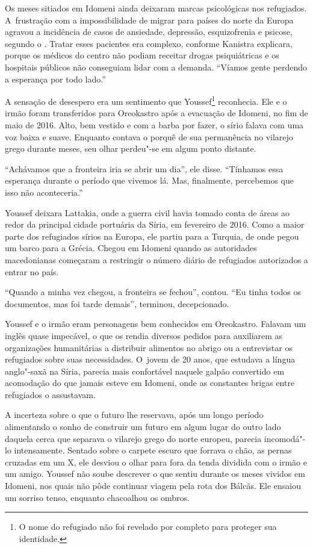 Os meses sitiados em Idomeni ainda deixaram marcas psicológicas nos
refugiados. A~frustração com a impossibilidade de migrar para países do
norte da Europa agravou a incidência de casos de ansiedade, depressão,
esquizofrenia e psicose, segundo o . Tratar esses pacientes era
complexo, conforme Kanistra explicara, porque os médicos do centro não podiam receitar drogas psiquiátricas e os hospitais públicos não conseguiam lidar com a
demanda. ``Víamos gente perdendo a esperança por todo lado.''

A sensação de desespero era um sentimento que Youssef\footnote{ O nome do refugiado não foi revelado por completo
para proteger sua identidade.} 
reconhecia. Ele e o irmão foram transferidos para Oreokastro após a
evacuação de Idomeni, no fim de maio de 2016. Alto, bem vestido e com a
barba por fazer, o sírio falava com uma voz baixa e suave. Enquanto
contava o porquê de sua permanência no vilarejo grego durante meses, seu olhar
perdeu"-se em algum ponto distante.

``Achávamos que a fronteira iria se abrir um dia'', ele disse. ``Tínhamos
essa esperança durante o período que vivemos lá. Mas,
finalmente, percebemos que isso não aconteceria.''

Youssef deixara Lattakia, onde a guerra civil havia tomado conta de
áreas ao redor da principal cidade portuária da Síria, em fevereiro de
2016. Como a maior parte dos refugiados sírios na Europa, ele partiu para a
Turquia, de onde pegou um barco para a Grécia. Chegou em Idomeni quando
as autoridades macedonianas começaram a restringir o número diário de
refugiados autorizados a entrar no país.

``Quando a minha vez chegou, a fronteira se fechou'', contou. ``Eu
tinha todos os documentos, mas foi tarde demais'', terminou, decepcionado.

Youssef e o irmão eram personagens bem conhecidos em Oreokastro. Falavam
um inglês quase impecável, o que os rendia diversos pedidos para
auxiliarem as organizações humanitárias a distribuir alimentos no
abrigo ou a entrevistar os refugiados sobre suas necessidades. O~jovem
de 20 anos, que estudava a língua anglo"-saxã na Síria, parecia mais
confortável naquele galpão convertido em acomodação do que jamais esteve
em Idomeni, onde as constantes brigas entre refugiados o assustavam.

A incerteza sobre o que o futuro lhe reservava, após um longo período
alimentando o sonho de construir um futuro em algum lugar do outro lado
daquela cerca que separava o vilarejo grego do norte europeu, parecia
incomodá"-lo intensamente. Sentado sobre o carpete escuro que forrava o
chão, as pernas cruzadas em um X, ele desviou o olhar para fora da tenda
dividida com o irmão e um amigo.  Youssef não soube
descrever o que sentiu durante os meses vividos em Idomeni, nos quais
não pôde continuar viagem pela rota dos Bálcãs. Ele ensaiou um sorriso
tenso, enquanto chacoalhou os ombros.

